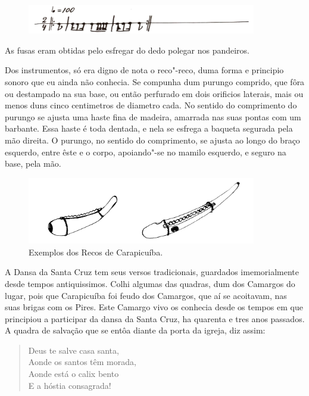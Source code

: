 \begin{figure}[!ht]
\centering
 \includegraphics[width=100mm]{./imgs/img1.jpg}
\end{figure}

As fusas eram obtidas pelo esfregar do dedo polegar nos pandeiros.

Dos instrumentos, só era digno de nota o reco"-reco, duma forma e
principio sonoro que eu ainda não conhecia. Se compunha dum purungo
comprido, que fôra ou destampado na sua base, ou então perfurado em dois
orificios laterais, mais ou menos duns cinco centimetros de diametro
cada. No sentido do comprimento do purungo se ajusta uma haste fina de
madeira, amarrada nas suas pontas com um barbante. Essa haste é toda
dentada, e nela se esfrega a baqueta segurada pela mão direita. O
purungo, no sentido do comprimento, se ajusta ao longo do braço
esquerdo, entre êste e o corpo, apoiando"-se no mamilo esquerdo, e seguro
na base, pela mão.

\begin{figure}[!ht]
\centering
 \includegraphics[width=100mm]{./imgs/img2.jpg}
\caption{Exemplos dos Recos de Carapicuíba.}
\end{figure}

A Dansa da Santa Cruz tem seus versos tradicionais, guardados
imemorialmente desde tempos antiquissimos. Colhi algumas das quadras,
dum dos Camargos do lugar, pois que Carapicuíba foi feudo dos Camargos,
que aí se acoitavam, nas suas brigas com os Pires. Este Camargo vivo os
conhecia desde os tempos em que principiou a participar da dansa da
Santa Cruz, ha quarenta e tres anos passados. A quadra de salvação que
se entôa diante da porta da igreja, diz assim:

\begin{verse}
Deus te salve casa santa,\\
Aonde os santos têm morada,\\
Aonde está o calix bento\\
E a hóstia consagrada!
\end{verse}


